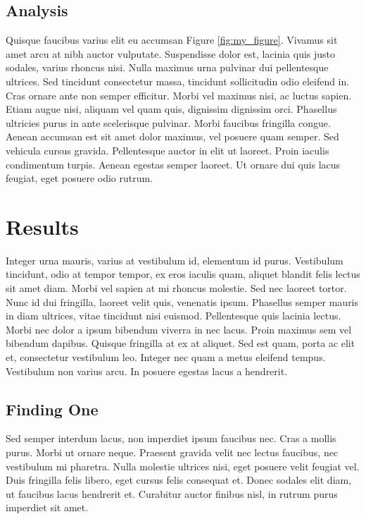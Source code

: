 \documentclass[12pt,letterpaper]{article} %
\begin{document}
\subsection*{Analysis}
Quisque faucibus varius elit eu accumsan Figure \ref{fig:my_figure}. Vivamus sit amet arcu at nibh auctor vulputate. Suspendisse dolor est, lacinia quis justo sodales, varius rhoncus nisi. Nulla maximus urna pulvinar dui pellentesque ultrices. Sed tincidunt consectetur massa, tincidunt sollicitudin odio eleifend in. Cras ornare ante non semper efficitur. Morbi vel maximus nisi, ac luctus sapien. Etiam augue nisi, aliquam vel quam quis, dignissim dignissim orci. Phasellus ultricies purus in ante scelerisque pulvinar. Morbi faucibus fringilla congue. Aenean accumsan est sit amet dolor maximus, vel posuere quam semper. Sed vehicula cursus gravida. Pellentesque auctor in elit ut laoreet. Proin iaculis condimentum turpis. Aenean egestas semper laoreet. Ut ornare dui quis lacus feugiat, eget posuere odio rutrum.

\section*{Results}

Integer urna mauris, varius at vestibulum id, elementum id purus. Vestibulum tincidunt, odio at tempor tempor, ex eros iaculis quam, aliquet blandit felis lectus sit amet diam. Morbi vel sapien at mi rhoncus molestie. Sed nec laoreet tortor. Nunc id dui fringilla, laoreet velit quis, venenatis ipsum. Phasellus semper mauris in diam ultrices, vitae tincidunt nisi euismod. Pellentesque quis lacinia lectus. Morbi nec dolor a ipsum bibendum viverra in nec lacus. Proin maximus sem vel bibendum dapibus. Quisque fringilla at ex at aliquet. Sed est quam, porta ac elit et, consectetur vestibulum leo. Integer nec quam a metus eleifend tempus. Vestibulum non varius arcu. In posuere egestas lacus a hendrerit.

\subsection*{Finding One}

Sed semper interdum lacus, non imperdiet ipsum faucibus nec. Cras a mollis purus. Morbi ut ornare neque. Praesent gravida velit nec lectus faucibus, nec vestibulum mi pharetra. Nulla molestie ultrices nisi, eget posuere velit feugiat vel. Duis fringilla felis libero, eget cursus felis consequat et. Donec sodales elit diam, ut faucibus lacus hendrerit et. Curabitur auctor finibus nisl, in rutrum purus imperdiet sit amet.
\end{document}
